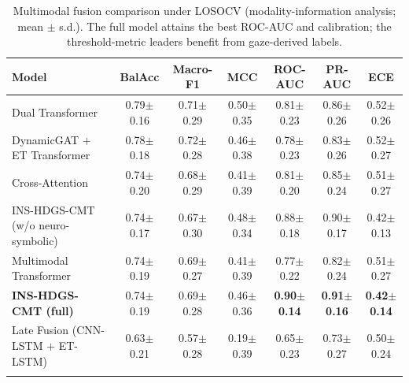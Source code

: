 \begin{table}[t]
  \caption{Multimodal fusion comparison under LOSOCV (modality-information analysis; mean $\pm$ s.d.). The full model attains the best ROC-AUC and calibration; the threshold-metric leaders benefit from gaze-derived labels.}
  \label{tab:fusion}
  \centering
  \small
  \begin{tabular}{@{}lcccccc@{}}
    \toprule
    Model & BalAcc & Macro-F1 & MCC & ROC-AUC & PR-AUC & ECE \\
    \midrule
    Dual Transformer                  & 0.79$\pm$0.16 & 0.71$\pm$0.29 & 0.50$\pm$0.35 & 0.81$\pm$0.23 & 0.86$\pm$0.26 & 0.52$\pm$0.26 \\
    DynamicGAT $+$ ET Transformer     & 0.78$\pm$0.18 & 0.72$\pm$0.28 & 0.46$\pm$0.38 & 0.78$\pm$0.23 & 0.83$\pm$0.26 & 0.52$\pm$0.27 \\
    Cross-Attention                   & 0.74$\pm$0.20 & 0.68$\pm$0.29 & 0.41$\pm$0.39 & 0.81$\pm$0.20 & 0.85$\pm$0.24 & 0.51$\pm$0.27 \\
    INS-HDGS-CMT (w/o neuro-symbolic)  & 0.74$\pm$0.17 & 0.67$\pm$0.30 & 0.48$\pm$0.34 & 0.88$\pm$0.18 & 0.90$\pm$0.17 & 0.42$\pm$0.13 \\
    Multimodal Transformer            & 0.74$\pm$0.19 & 0.69$\pm$0.27 & 0.41$\pm$0.39 & 0.77$\pm$0.22 & 0.82$\pm$0.24 & 0.51$\pm$0.27 \\
    \textbf{INS-HDGS-CMT (full)}       & 0.74$\pm$0.19 & 0.69$\pm$0.28 & 0.46$\pm$0.36 & \textbf{0.90$\pm$0.14} & \textbf{0.91$\pm$0.16} & \textbf{0.42$\pm$0.14} \\
    Late Fusion (CNN-LSTM $+$ ET-LSTM) & 0.63$\pm$0.21 & 0.57$\pm$0.28 & 0.19$\pm$0.39 & 0.65$\pm$0.23 & 0.73$\pm$0.27 & 0.50$\pm$0.24 \\
    \botrule
  \end{tabular}
\end{table}
